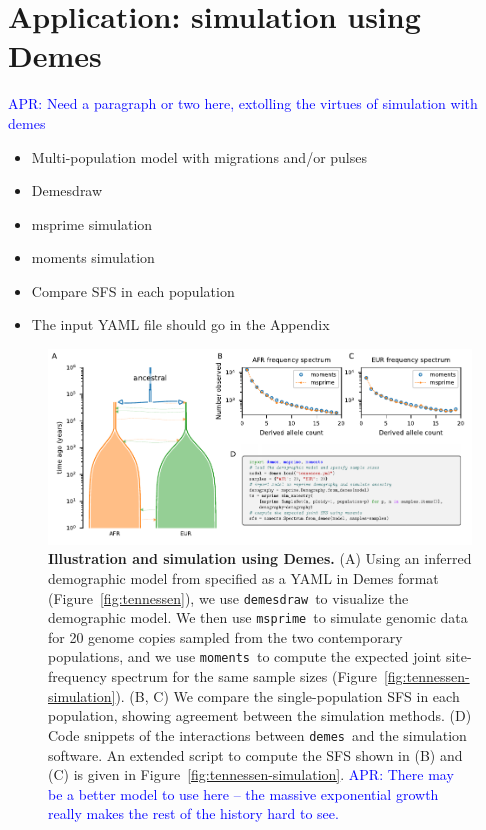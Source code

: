 \documentclass[11pt]{article}
\newcommand{\msprime}[0]{\texttt{msprime}}
\newcommand{\demes}[0]{\texttt{demes}}
\newcommand{\demesdraw}[0]{\texttt{demesdraw}}
\newcommand{\moments}[0]{\texttt{moments}}
\newcommand{\aprcomment}[1]{{\textcolor{blue}{APR: #1}}}
\begin{document}
\section*{Application: simulation using Demes}

\aprcomment{Need a paragraph or two here, extolling the virtues of simulation with demes}

\begin{itemize}
    \item Multi-population model with migrations and/or pulses
    \item Demesdraw
    \item msprime simulation
    \item moments simulation
    \item Compare SFS in each population
    \item The input YAML file should go in the Appendix
\end{itemize}

\begin{figure}[tb!]
    \centering
    \includegraphics{fig/showcase}
    \caption{
        \textbf{Illustration and simulation using Demes.}
        (A)
        Using an inferred demographic model from \citet{tennessen2012evolution}
        specified as a YAML in Demes format (Figure~\ref{fig:tennessen}), we
        use \demesdraw\ to visualize the demographic model.
        We then use \msprime\ to simulate genomic data for 20 genome copies
        sampled from the two contemporary populations, and we use \moments\
        to compute the expected joint site-frequency spectrum for the same
        sample sizes (Figure~\ref{fig:tennessen-simulation}).
        (B, C) We compare the single-population SFS in each population, showing
        agreement between the simulation methods.
        (D) Code snippets of the interactions between \demes\ and the simulation
        software. An extended script to compute the SFS shown in (B) and (C) is
        given in Figure~\ref{fig:tennessen-simulation}.
        \aprcomment{There may be a better model to use here -- the massive
        exponential growth really makes the rest of the history hard to see.}
    }
    \label{fig:showcase}
\end{figure}
\end{document}

